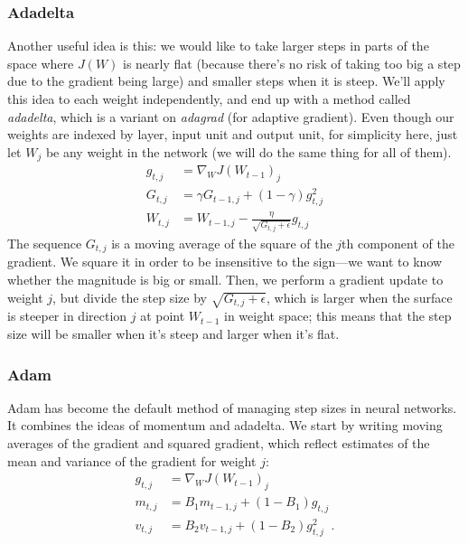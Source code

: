 \subsubsection{Adadelta}
Another useful idea is this:  we would like to take larger steps in
parts of the space where $J(W)$ is nearly flat (because there's no risk of
taking too big a step due to the gradient being large) and smaller
steps when it is steep.  We'll apply this idea to each weight
independently, and end up with a method called {\em adadelta}, which
is a variant on {\em adagrad} (for
adaptive gradient).   Even though our weights are indexed by layer,
input unit and output unit,  for simplicity here,  just let $W_j$ be
any weight in the network (we will do the same thing for all of
them).   
\begin{align*}
 g_{t,j} & = \nabla_W J(W_{t-1})_j \\
 G_{t,j} & = \gamma G_{t - 1,j} + (1 - \gamma)g_{t,j}^2 \\
W_{t,j} & = W_{t-1, j} - \frac{\eta}{\sqrt{G_{t,j} + \epsilon}}g_{t,j} 
\end{align*}
The sequence $G_{t,j}$ is a moving average of the  square of the
$j$th component of the gradient.  We square it in order to be
insensitive to the sign---we want to know whether the magnitude is big
or small.  Then, we perform a gradient update to weight $j$, but
divide the step  size by $\sqrt{G_{t,j} + \epsilon}$, which is larger
when the surface is steeper in direction $j$ at point $W_{t-1}$ in
weight space;  this means that the step size will be smaller when it's
steep and  larger when it's flat.

\subsubsection{Adam}

Adam has become the default method of managing step sizes in neural
networks.   It combines the ideas  of
momentum and adadelta.  We start by writing moving averages of the
gradient and squared gradient, which reflect estimates of the mean and
variance of the gradient for weight $j$:
\begin{align*}
 g_{t,j} & = \nabla_W J(W_{t-1})_j \\
 m_{t,j} & = B_1m_{t - 1,j} + (1 - B_1)g_{t,j} \\
 v_{t,j} & = B_2v_{t - 1,j} + (1 - B_2)g_{t,j}^2  \;\;.
\end{align*}

